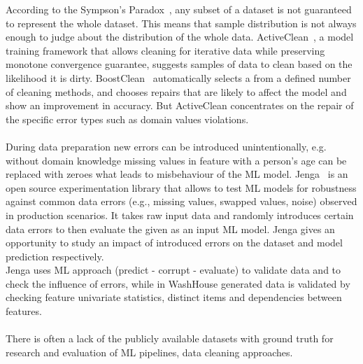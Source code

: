 According to the Sympson's Paradox~\cite{activeclean}, any subset of a dataset is not guaranteed to represent the whole dataset.
This means that sample distribution is not always enough to judge about the distribution of the whole data. 
ActiveClean~\cite{activeclean}, a model training framework that allows cleaning for iterative data while preserving monotone convergence guarantee, suggests samples of data to clean based on the likelihood it is dirty. 
BoostClean~\cite{boostclean} automatically selects a from a defined number of cleaning methods, and chooses repairs that are likely to affect the model and show an improvement in accuracy. 
But ActiveClean concentrates on the repair of the specific error types such as domain values violations.\\\\
During data preparation new errors can be introduced unintentionally, e.g. without domain knowledge missing values in feature with a person's age can be replaced with zeroes what leads to misbehaviour of the ML model.
Jenga~\cite{jenga} is an open source experimentation library that allows to test ML models for robustness against common data errors (e.g., missing values, swapped values, noise) observed in production scenarios.
It takes raw input data and randomly introduces certain data errors to then evaluate the given as an input ML model. Jenga gives an opportunity to study an impact of introduced errors on the dataset and model prediction respectively.\\
Jenga uses ML approach (predict - corrupt - evaluate) to validate data and to check the influence of errors, while in WashHouse generated data is validated by checking feature univariate statistics, distinct items and dependencies between features.\\\\
There is often a lack of the publicly available datasets with ground truth for research and evaluation of ML pipelines, data cleaning approaches. 
